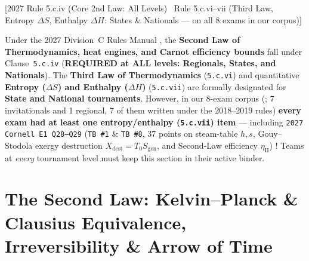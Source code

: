 [2027 Rule 5.c.iv (Core 2nd Law: All Levels) \textbar\ Rule 5.c.vi--vii (Third Law, Entropy $\Delta S$, Enthalpy $\Delta H$: States \& Nationals --- on all 8 exams in our corpus)]


\begin{tierbox}
Under the 2027 Division~C Rules Manual , the \textbf{Second Law of Thermodynamics, heat engines, and Carnot efficiency bounds} fall under Clause~\texttt{5.c.iv} (\textbf{REQUIRED at ALL levels: Regionals, States, and Nationals}). The \textbf{Third Law of Thermodynamics} (\texttt{5.c.vi}) and quantitative \textbf{Entropy ($\Delta S$) and Enthalpy ($\Delta H$)} (\texttt{5.c.vii}) are formally designated for \textbf{State and National tournaments}. However, in our 8-exam corpus (; 7 invitationals and 1 regional, 7 of them written under the 2018--2019 rules) \textbf{every exam had at least one entropy/enthalpy (\texttt{5.c.vii}) item} --- including \texttt{2027 Cornell E1 Q28--Q29} (\texttt{TB~\#1} \& \texttt{TB~\#8}, 37 points on steam-table $h, s$, Gouy--Stodola exergy destruction $X_{\mathrm{dest}} = T_0 S_{\mathrm{gen}}$, and Second-Law efficiency $\eta_{\mathrm{II}}$) ! Teams at \emph{every} tournament level must keep this section in their active binder.
\end{tierbox}

\section{The Second Law: Kelvin--Planck \& Clausius Equivalence, Irreversibility \& Arrow of Time}\label{sec:08.1}

